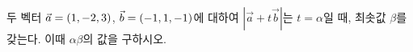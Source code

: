 두 벡터 $\vec{a}=(1{,}\mkern3mu\mathopen{}-2{,}\mkern3mu\mathopen{}3)$, $\vec{b}=(-1{,}\mkern3mu\mathopen{}1{,}\mkern3mu\mathopen{}-1)$에 대하여 $|\vec{a}+t\vec{b}|$는 $t=\alpha$일 때, 최솟값 $\beta$를 갖는다. 이때 $\alpha\beta$의 값을 구하시오. 
